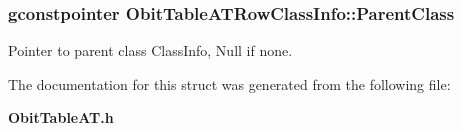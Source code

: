 \subsubsection{\setlength{\rightskip}{0pt plus 5cm}gconstpointer {\bf Obit\-Table\-ATRow\-Class\-Info::Parent\-Class}}\label{structObitTableATRowClassInfo_o3}


Pointer to parent class Class\-Info, Null if none. 



The documentation for this struct was generated from the following file:\begin{CompactItemize}
\item 
{\bf Obit\-Table\-AT.h}\end{CompactItemize}
